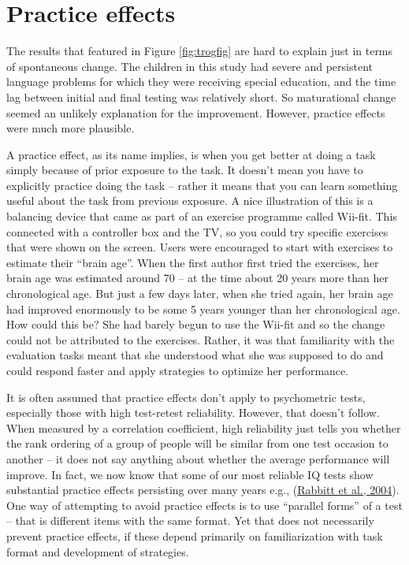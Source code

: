 \documentclass{krantz}
\begin{document}
\hypertarget{practice-effects-1}{%
\section{Practice effects}\label{practice-effects-1}}

The results that featured in Figure \ref{fig:trogfig} are hard to explain just in terms of spontaneous change. The children in this study had severe and persistent language problems for which they were receiving special education, and the time lag between initial and final testing was relatively short. So maturational change seemed an unlikely explanation for the improvement. However, practice effects were much more plausible.

A practice effect, as its name implies, is when you get better at doing a task simply because of prior exposure to the task. It doesn't mean you have to explicitly practice doing the task -- rather it means that you can learn something useful about the task from previous exposure. A nice illustration of this is a balancing device that came as part of an exercise programme called Wii-fit. This connected with a controller box and the TV, so you could try specific exercises that were shown on the screen. Users were encouraged to start with exercises to estimate their ``brain age''. When the first author first tried the exercises, her brain age was estimated around 70 -- at the time about 20 years more than her chronological age. But just a few days later, when she tried again, her brain age had improved enormously to be some 5 years younger than her chronological age. How could this be? She had barely begun to use the Wii-fit and so the change could not be attributed to the exercises. Rather, it was that familiarity with the evaluation tasks meant that she understood what she was supposed to do and could respond faster and apply strategies to optimize her performance.

It is often assumed that practice effects don't apply to psychometric tests, especially those with high test-retest reliability. However, that doesn't follow. When measured by a correlation coefficient, high reliability just tells you whether the rank ordering of a group of people will be similar from one test occasion to another -- it does not say anything about whether the average performance will improve. In fact, we now know that some of our most reliable IQ tests show substantial practice effects persisting over many years e.g., (\protect\hyperlink{ref-rabbitt2004}{Rabbitt et al., 2004}). One way of attempting to avoid practice effects is to use ``parallel forms'' of a test -- that is different items with the same format. Yet that does not necessarily prevent practice effects, if these depend primarily on familiarization with task format and development of strategies.
\end{document}
